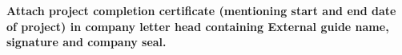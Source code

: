 \thispagestyle{empty}
\textbf{Attach project completion certificate (mentioning start and end date of project) in company letter head containing External guide name, signature and company seal.}
% 